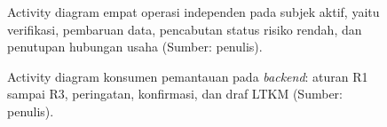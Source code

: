 \begin{figure}[htbp]
\centering
\resizebox{\textwidth}{!}{}
\caption{Activity diagram empat operasi independen pada subjek aktif, yaitu verifikasi, pembaruan data, pencabutan status risiko rendah, dan penutupan hubungan usaha (Sumber: penulis).}
\label{fig:ch3-ad-08}
\end{figure}

\begin{figure}[htbp]
\centering
\resizebox{\textwidth}{!}{}
\caption{Activity diagram konsumen pemantauan pada \textit{backend}: aturan R1 sampai R3, peringatan, konfirmasi, dan draf LTKM (Sumber: penulis).}
\label{fig:ch3-ad-09}
\end{figure}
